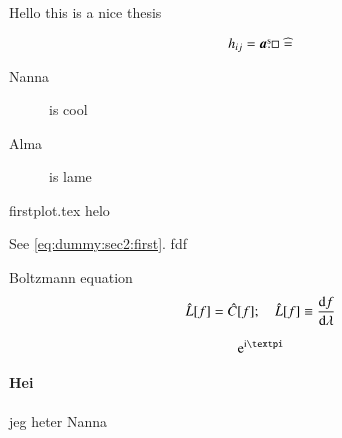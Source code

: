 

Hello this is a nice thesis

\begin{equation}\label{eq:dummy:sec2:first}
    h_{ij} = \boldsymbol{a} \overset{\text{s}}{.} \Box \mathrel{\widehat{=}} 
\end{equation}


\begin{description}
    \item[Nanna] is cool 
    \item[Alma] is lame 
\end{description}


{firstplot.tex}
helo


See \ref{eq:dummy:sec2:first}. fdf \cite{vachaspati_kinks_2006}

Boltzmann equation
\begin{equation}
    \hat{L}[f] = \hat{C}[f]; \quad \hat{L}[f]\equiv \dv{f}{\lambda}
\end{equation}

\begin{equation}
   \eu[\im \ppi]
\end{equation}

\paragraph*{Hei} jeg heter Nanna